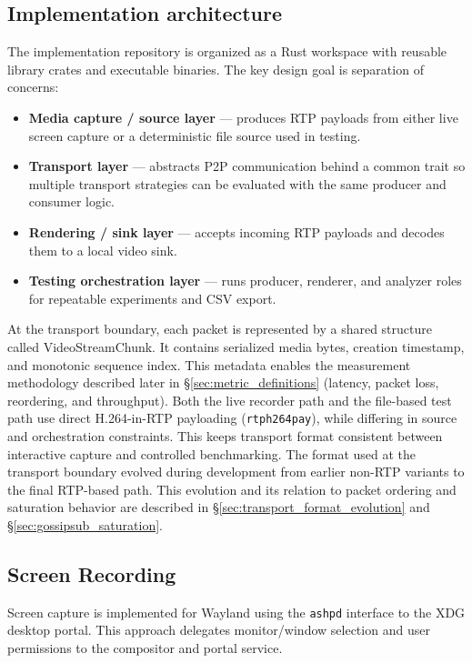 \subsection{Implementation architecture}
The implementation repository is organized as a Rust workspace with reusable library crates and executable binaries.
The key design goal is separation of concerns:
\begin{itemize}
    \item \textbf{Media capture / source layer} --- produces \ac{RTP} payloads from either live screen capture or a deterministic file source used in testing.
    \item \textbf{Transport layer} --- abstracts 
    \ac{P2P} communication behind a common trait so multiple transport strategies can be evaluated with the same producer and consumer logic.
    \item \textbf{Rendering / sink layer} --- accepts incoming \ac{RTP} payloads and decodes them to a local video sink.
    \item \textbf{Testing orchestration layer} --- runs producer, renderer, and analyzer roles for repeatable experiments and CSV export.
\end{itemize}

At the transport boundary, each packet is represented by a shared structure called VideoStreamChunk.
It contains serialized media bytes, creation timestamp, and monotonic sequence index.
This metadata enables the measurement methodology described later in \S\ref{sec:metric_definitions} (latency, packet loss, reordering, and throughput).
Both the live recorder path and the file-based test path use direct H.264-in-\ac{RTP} payloading (\texttt{rtph264pay}), while differing in source and orchestration constraints.
This keeps transport format consistent between interactive capture and controlled benchmarking.
The format used at the transport boundary evolved during development from earlier non-\ac{RTP} variants to the final \ac{RTP}-based path. This evolution and its relation to packet ordering and saturation behavior are described in \S\ref{sec:transport_format_evolution} and \S\ref{sec:gossipsub_saturation}.
\subsection{Screen Recording}
Screen capture is implemented for Wayland using the \texttt{ashpd} interface to the XDG desktop portal.
This approach delegates monitor/window selection and user permissions to the compositor and portal service.

